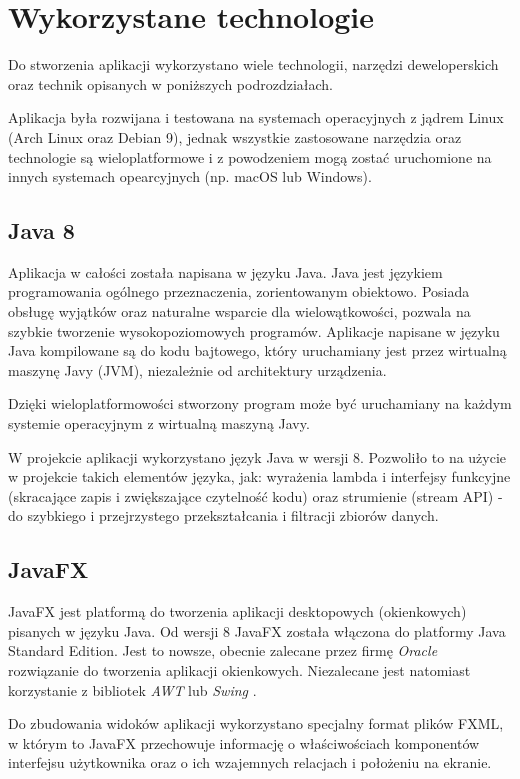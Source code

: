 \section{Wykorzystane technologie}
Do stworzenia aplikacji wykorzystano wiele technologii, narzędzi deweloperskich oraz technik opisanych w poniższych podrozdziałach.

Aplikacja była rozwijana i testowana na systemach operacyjnych z jądrem Linux (Arch Linux oraz Debian 9), jednak wszystkie zastosowane narzędzia oraz technologie są wieloplatformowe i z powodzeniem mogą zostać uruchomione na innych systemach opearcyjnych (np. macOS lub Windows).

\subsection{Java 8}
Aplikacja w całości została napisana w języku Java.
Java jest językiem programowania ogólnego przeznaczenia, zorientowanym obiektowo. Posiada obsługę wyjątków oraz naturalne wsparcie dla wielowątkowości, pozwala na szybkie tworzenie wysokopoziomowych programów. Aplikacje napisane w języku Java kompilowane są do kodu bajtowego, który uruchamiany jest przez wirtualną maszynę Javy (JVM), niezależnie od architektury urządzenia.

Dzięki wieloplatformowości stworzony program może być uruchamiany na każdym systemie operacyjnym z wirtualną maszyną Javy.

W projekcie aplikacji wykorzystano język Java w wersji 8. 
Pozwoliło to na użycie w projekcie takich elementów języka, jak: wyrażenia lambda i interfejsy funkcyjne (skracające zapis i zwiększające czytelność kodu) oraz strumienie (stream API) - do szybkiego i przejrzystego przekształcania i filtracji zbiorów danych.

\subsection{JavaFX}
JavaFX jest platformą do tworzenia aplikacji desktopowych (okienkowych) pisanych w języku Java.
Od wersji 8 JavaFX została włączona do platformy Java Standard Edition.
Jest to nowsze, obecnie zalecane przez firmę {\it Oracle} rozwiązanie do tworzenia aplikacji okienkowych. Niezalecane jest natomiast korzystanie z bibliotek {\it AWT} lub {\it Swing} \cite{javafx-replacing-swing}.

Do zbudowania widoków aplikacji wykorzystano specjalny format plików FXML, w którym to JavaFX przechowuje informację o właściwościach komponentów interfejsu użytkownika oraz o ich wzajemnych relacjach i położeniu na ekranie.

